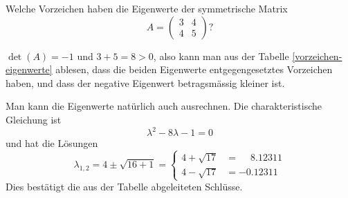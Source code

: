 \begin{beispiel}[Zahlenbeispiel]
Welche Vorzeichen haben die Eigenwerte der symmetrische Matrix
\[
A=\begin{pmatrix}
3&4\\
4&5
\end{pmatrix}?
\]

\smallskip
{\parindent 0pt $\det(A)=-1$ und $3+5=8>0$, also kann man aus der
Tabelle \ref{vorzeichen-eigenwerte}
ablesen, dass die beiden Eigenwerte entgegengesetztes
Vorzeichen haben, und dass der negative Eigenwert betragsmässig
kleiner ist.}

Man kann die Eigenwerte natürlich auch ausrechnen.
Die charakteristische Gleichung ist 
\[
\lambda^2-8\lambda-1=0
\]
und hat die Lösungen
\[
\lambda_{1,2}=4\pm\sqrt{16+1}=\begin{cases}
4+\sqrt{17}&=\phantom{-}8.12311\\
4-\sqrt{17}&=-0.12311
\end{cases}
\]
Dies bestätigt die aus der Tabelle abgeleiteten Schlüsse.
\end{beispiel}

